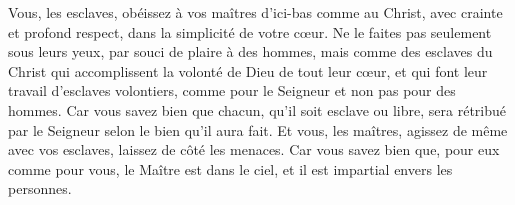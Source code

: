 Vous, les esclaves, obéissez à vos maîtres d’ici-bas comme au Christ,
	avec crainte et profond respect, dans la simplicité de votre cœur.
Ne le faites pas seulement sous leurs yeux, par souci de plaire à des hommes,
	mais comme des esclaves du Christ
		qui accomplissent la volonté de Dieu de tout leur cœur,
	et qui font leur travail d’esclaves volontiers,
	comme pour le Seigneur et non pas pour des hommes.
Car vous savez bien que chacun, qu’il soit esclave ou libre,
	sera rétribué par le Seigneur selon le bien qu’il aura fait.
Et vous, les maîtres, agissez de même avec vos esclaves, laissez de côté les menaces.
Car vous savez bien que, pour eux comme pour vous,
	le Maître est dans le ciel, et il est impartial envers les personnes.
